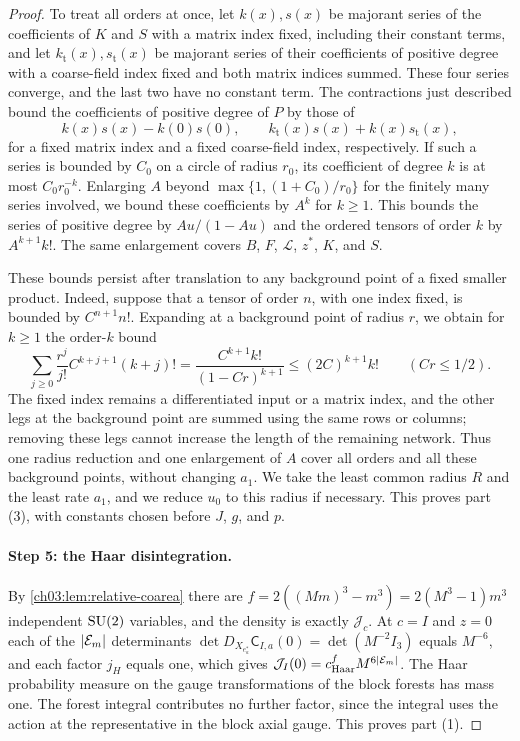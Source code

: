 \begin{proof}
To treat all orders at once, let $k(x),s(x)$ be majorant series of the coefficients of $K$ and $S$ with a matrix index fixed, including their constant terms, and let $k_{\mathrm t}(x),s_{\mathrm t}(x)$ be majorant series of their coefficients of positive degree with a coarse-field index fixed and both matrix indices summed. These four series converge, and the last two have no constant term. The contractions just described bound the coefficients of positive degree of $P$ by those of
\begin{equation}\label{ch09:eq:positive-root-majorant}
 k(x)s(x)-k(0)s(0),\qquad k_{\mathrm t}(x)s(x)+k(x)s_{\mathrm t}(x),
\end{equation}
for a fixed matrix index and a fixed coarse-field index, respectively. If such a series is bounded by $C_0$ on a circle of radius $r_0$, its coefficient of degree $k$ is at most $C_0r_0^{-k}$. Enlarging $A$ beyond $\max\{1,(1+C_0)/r_0\}$ for the finitely many series involved, we bound these coefficients by $A^k$ for $k\ge1$. This bounds the series of positive degree by $Au/(1-Au)$ and the ordered tensors of order $k$ by $A^{k+1}k!$. The same enlargement covers $B$, $F$, $\mathcal L$, $z^*$, $K$, and $S$.

These bounds persist after translation to any background point of a fixed smaller product. Indeed, suppose that a tensor of order $n$, with one index fixed, is bounded by $C^{n+1}n!$. Expanding at a background point of radius $r$, we obtain for $k\ge1$ the order-$k$ bound
\[
 \sum_{j\ge0}\frac{r^j}{j!}C^{k+j+1}(k+j)!=\frac{C^{k+1}k!}{(1-Cr)^{k+1}}\le(2C)^{k+1}k!\qquad(Cr\le1/2).
\]
The fixed index remains a differentiated input or a matrix index, and the other legs at the background point are summed using the same rows or columns; removing these legs cannot increase the length of the remaining network. Thus one radius reduction and one enlargement of $A$ cover all orders and all these background points, without changing $a_1$. We take the least common radius $R$ and the least rate $a_1$, and we reduce $u_0$ to this radius if necessary. This proves part (3), with constants chosen before $J$, $g$, and $p$.

\paragraph{Step 5: the Haar disintegration.}
By \cref{ch03:lem:relative-coarea} there are $f=2((Mm)^3-m^3)=2(M^3-1)m^3$ independent $\mathrm{SU}(2)$ variables, and the density is exactly $\mathcal J_c$. At $c=I$ and $z=0$ each of the $\lvert \mathcal E_{m}\rvert$ determinants $\det D_{X_{e^*_a}}\mathsf C_{I,a}(0)=\det(M^{-2}I_3)$ equals $M^{-6}$, and each factor $j_H$ equals one, which gives $\mathcal J_I(0)=c_{\mathrm{Haar}}^fM^{6\lvert \mathcal E_{m}\rvert}$. The Haar probability measure on the gauge transformations of the block forests has mass one. The forest integral contributes no further factor, since the integral uses the action at the representative in the block axial gauge. This proves part (1).


\end{proof}
